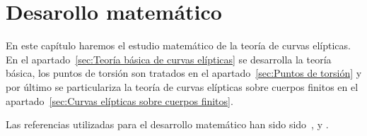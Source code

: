 \chapter{Desarollo matemático}
\label{ch:Desarollo matemático}



En este capítulo haremos el estudio matemático de la teoría de curvas elípticas. En el apartado~\ref{sec:Teoría básica de curvas elípticas} se desarrolla la teoría básica, los puntos de torsión son tratados en el apartado~\ref{sec:Puntos de torsión} y por último se particulariza la teoría de curvas elípticas sobre cuerpos finitos en el apartado~\ref{sec:Curvas elípticas sobre cuerpos finitos}.

Las referencias utilizadas para el desarrollo matemático han sido sido~\cite{Washington:2008}, \cite{Hankerson:2003} y \cite{Silverman:2009}.





